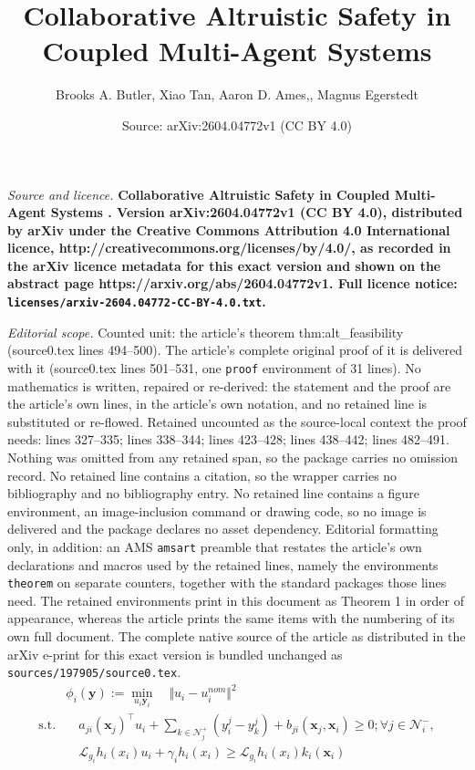 \documentclass[10pt,a4paper]{amsart}
\title{\LARGE \bf Collaborative Altruistic Safety in Coupled Multi-Agent Systems \vspace{-1.5ex}}
\author{Brooks A. Butler, Xiao Tan, Aaron D. Ames,, Magnus Egerstedt}
\date{Source: arXiv:2604.04772v1 (CC BY 4.0)}
\begin{document}
\maketitle

\noindent\emph{Source and licence.} \LARGE \bf Collaborative Altruistic Safety in Coupled Multi-Agent Systems \vspace{-1.5ex}. Version arXiv:2604.04772v1 (CC BY 4.0), distributed by arXiv under the Creative Commons Attribution 4.0 International licence, http://creativecommons.org/licenses/by/4.0/, as recorded in the arXiv licence metadata for this exact version and shown on the abstract page https://arxiv.org/abs/2604.04772v1. Full licence notice: \texttt{licenses/arxiv-2604.04772-CC-BY-4.0.txt}.\par\smallskip

\noindent\textit{Editorial scope.} Counted unit: the article's theorem thm:alt\_feasibility (source0.tex lines 494--500). The article's complete original proof of it is delivered with it (source0.tex lines 501--531, one \texttt{proof} environment of 31 lines). No mathematics is written, repaired or re-derived: the statement and the proof are the article's own lines, in the article's own notation, and no retained line is substituted or re-flowed.  Retained uncounted as the source-local context the proof needs: lines 327--335; lines 338--344; lines 423--428; lines 438--442; lines 482--491.  Nothing was omitted from any retained span, so the package carries no omission record.  No retained line contains a citation, so the wrapper carries no bibliography and no bibliography entry.  No retained line contains a figure environment, an image-inclusion command or drawing code, so no image is delivered and the package declares no asset dependency.  Editorial formatting only, in addition: an AMS \texttt{amsart} preamble that restates the article's own declarations and macros used by the retained lines, namely the environments \texttt{theorem} on separate counters, together with the standard packages those lines need.  The retained environments print in this document as Theorem 1 in order of appearance, whereas the article prints the same items with the numbering of its own full document.  The complete native source of the article as distributed in the arXiv e-print for this exact version is bundled unchanged as \texttt{sources/197905/source0.tex}.
\begin{align}
    &\phi_i(\mathbf{y}) := \min_{u_i \mathbf{y}_i} \quad \Vert u_i - u_{i}^{nom} \Vert^2 \nonumber\\
     \text{s.t.} & \quad a_{ji}(\mathbf{x}_j)^\top u_i  + \sum_{k \in \mathcal{N}_j^+} (y_i^j - y_k^j) +  b_{ji}(\mathbf{x}_j,\mathbf{x}_i) \geq 0
     ;\forall j \in \mathcal{N}_i^-, \nonumber\\
     & \quad
     \mathcal{L}_{g_i}h_i(x_i) u_i +  \gamma_i h_i(x_i) \geq \mathcal{L}_{g_i}h_i(x_i) k_i(\mathbf{x}_i) \label{eq:prob_statement_distr}
\end{align}
\end{document}
